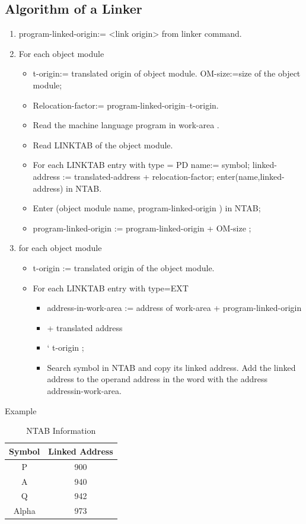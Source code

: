 \documentclass[a4paper,12pt]{extarticle}
\begin{document}
\subsection{Algorithm of a Linker}
\begin{enumerate}
	\item program-linked-origin:= <link origin> from linker command.
	\item For each object module
	\begin{itemize}
		\item t-origin:= translated origin of object module. OM-size:=size of the object module;
		\item Relocation-factor:= program-linked-origin–t-origin.
		\item Read the machine language program in work-area .
		\item Read LINKTAB of the object module.
		\item For each LINKTAB entry with type = PD\newline
		name:= symbol;\newline
		linked-address := translated-address + relocation-factor;\newline
		enter(name,linked-address) in NTAB.\newline
		\item Enter (object module name, program-linked-origin ) in NTAB;
		\item program-linked-origin := program-linked-origin + OM-size ;
	\end{itemize}
	\item for each object module
	\begin{itemize}
		\item t-origin := translated origin of the object module.
		\item For each LINKTAB entry with type=EXT
		\begin{itemize} 
			\item address-in-work-area := address of work-area + program-linked-origin
			\item < link-origin > + translated address \item ‘ t-origin ;
			\item Search symbol in NTAB and copy its linked address. Add the linked address to the operand address in the word with the address addressin-work-area.
		\end{itemize}
	\end{itemize}
\end{enumerate}
Example\newline
\begin{table}\centering
	\begin{tabular}{ ||c|c||}
		\hline \hline
		Symbol & Linked Address \\
	\hline	\hline
		P      & 900            \\
	\hline	
	A      & 940            \\
	\hline
		Q      & 942            \\
	\hline	
	Alpha  & 973     \\
	\hline      
	\end{tabular}
	\caption{NTAB Information}
	\label{ntab_info}
\end{table}
\end{document}

